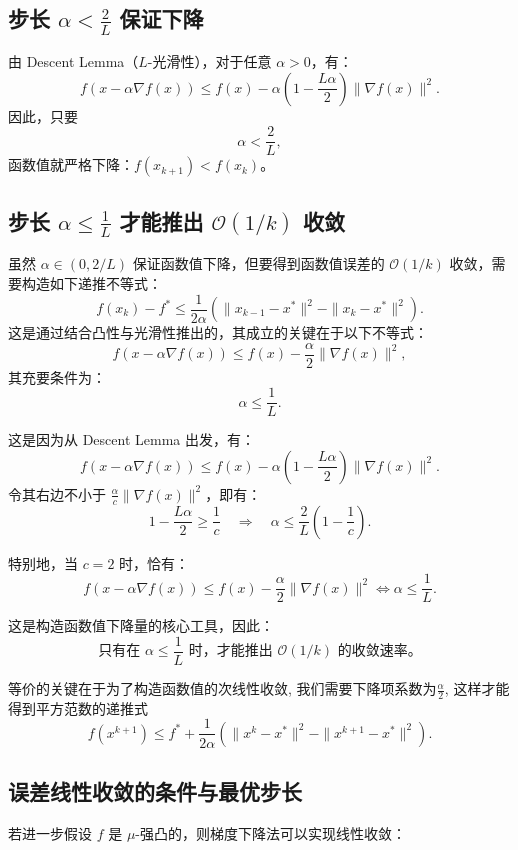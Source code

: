\subsection{步长 $\alpha < \frac{2}{L}$ 保证下降}

由 Descent Lemma（$L$-光滑性），对于任意 $\alpha > 0$，有：
\[
f(x - \alpha \nabla f(x)) \le f(x) - \alpha\left(1 - \frac{L\alpha}{2} \right) \|\nabla f(x)\|^2.
\]
因此，只要
\[
\alpha < \frac{2}{L},
\]
函数值就严格下降：$f(x_{k+1}) < f(x_k)$。

\subsection{步长 $\alpha \le \frac{1}{L}$ 才能推出 $\mathcal{O}(1/k)$ 收敛}

虽然 $\alpha \in (0, 2/L)$ 保证函数值下降，但要得到函数值误差的 $\mathcal{O}(1/k)$ 收敛，需要构造如下递推不等式：
\[
f(x_k) - f^* \le \frac{1}{2\alpha} \left( \|x_{k-1} - x^*\|^2 - \|x_k - x^*\|^2 \right).
\]
这是通过结合凸性与光滑性推出的，其成立的关键在于以下不等式：
\[
f(x - \alpha \nabla f(x)) \le f(x) - \frac{\alpha}{2} \|\nabla f(x)\|^2,
\]
其充要条件为：
\[
\boxed{\alpha \le \frac{1}{L}}.
\]

这是因为从 Descent Lemma 出发，有：
\[
f(x - \alpha \nabla f(x)) \le f(x) - \alpha\left(1 - \frac{L\alpha}{2} \right) \|\nabla f(x)\|^2.
\]
令其右边不小于 $\frac{\alpha}{c} \|\nabla f(x)\|^2$，即有：
\[
1 - \frac{L\alpha}{2} \ge \frac{1}{c} \quad \Rightarrow \quad \alpha \le \frac{2}{L}\left(1 - \frac{1}{c} \right).
\]

特别地，当 $c=2$ 时，恰有：
\[
\boxed{f(x - \alpha \nabla f(x)) \le f(x) - \frac{\alpha}{2} \|\nabla f(x)\|^2 \iff \alpha \le \frac{1}{L}}.
\]

这是构造函数值下降量的核心工具，因此：
\[
\boxed{\text{只有在 } \alpha \le \frac{1}{L} \text{ 时，才能推出 } \mathcal{O}(1/k) \text{ 的收敛速率。}}
\]
\begin{remark}
	等价的关键在于为了构造函数值的次线性收敛, 
	我们需要下降项系数为$\frac{\alpha}{2}$, 这样才能得到平方范数的递推式
	\[
	f(x^{k+1}) \leq f^* +\frac{1}{2\alpha} (\|x^{k}-x^*\|^2-\|x^{k+1}-x^*\|^2).
	\]
\end{remark}
\subsection{误差线性收敛的条件与最优步长}

若进一步假设 $f$ 是 $\mu$-强凸的，则梯度下降法可以实现线性收敛：

